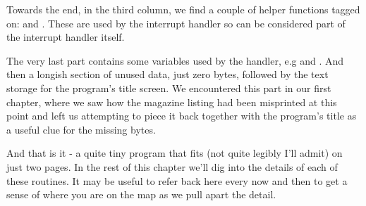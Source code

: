 Towards the end, in the third column, we find a couple of helper functions tagged on: 
and . These are used by the interrupt handler so can be considered part
of the interrupt handler itself. 

The very last part contains some variables used by the handler, e.g  and .
And then a longish section of unused data, just zero bytes, followed by the text storage for the program's title
screen. We encountered this part in our first chapter, where we saw how the magazine listing had been misprinted
at this point and left us attempting to piece it back together with the program's title as a useful clue for the
missing bytes.

And that is it - a quite tiny program that fits (not quite legibly I'll admit) on just two pages. In the rest of
this chapter we'll dig into the details of each of these routines. It may be useful to refer back here every now
and then to get a sense of where you are on the map as we pull apart the detail.

\clearpage

